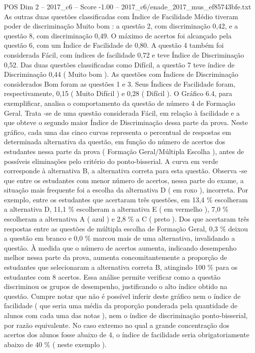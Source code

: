 \begin{textsample}{POS Dim 2 – 2017\_c6 – Score -1.00 – 2017\_c6/enade\_2017\_mus\_ef85743bfe.txt}
As outras duas questões classificadas com Índice de Facilidade Médio tiveram poder de discriminação Muito bom : a questão 2, com discriminação 0,42, e a questão 8, com discriminação 0,49.
O máximo de acertos foi alcançado pela questão 6, com um Índice de Facilidade de 0,80.
A questão 4 também foi considerada Fácil, com índices de facilidade 0,72 e teve Índice de Discriminação 0,52.
Das duas questões classificadas como Difícil, a questão 7 teve índice de Discriminação 0,44 ( Muito bom ).
As questões com Índices de Discriminação considerados Bom foram as questões 1 e 3.
Seus Índices de Facilidade foram, respectivamente, 0,15 ( Muito Difícil ) e 0,28 ( Difícil ).
O Gráfico 6.4, para exemplificar, analisa o comportamento da questão de número 4 de Formação Geral.
Trata -se de uma questão considerada Fácil, em relação à facilidade e a que obteve o segundo maior Índice de Discriminação dessa parte da prova.
Neste gráfico, cada uma das cinco curvas representa o percentual de respostas em determinada alternativa da questão, em função do número de acertos dos estudantes nessa parte da prova ( Formação Geral/Múltipla Escolha ), antes de possíveis eliminações pelo critério do ponto-bisserial.
A curva em verde corresponde à alternativa B, a alternativa correta para esta questão.
Observa -se que entre os estudantes com menor número de acertos, nessa parte do exame, a situação mais frequente foi a escolha da alternativa D ( em roxo ), incorreta.
Por exemplo, entre os estudantes que acertaram três questões, em 13,4 \% escolheram a alternativa D, 11,1 \% escolheram a alternativa E ( em vermelho ), 7,0 \% escolheram a alternativa A ( azul ) e 2,8 \% a C ( preto ).
Dos que acertaram três respostas entre as questões de múltipla escolha de Formação Geral, 0,3 \% deixou a questão em branco e 0,0 \% marcou mais de uma alternativa, invalidando a questão.
À medida que o número de acertos aumenta, indicando desempenho melhor nessa parte da prova, aumenta concomitantemente a proporção de estudantes que selecionaram a alternativa correta B, atingindo 100 \% para os estudantes com 8 acertos.
Essa análise permite verificar como a questão discriminou os grupos de desempenho, justificando o alto índice obtido na questão.
Cumpre notar que não é possível inferir deste gráfico nem o índice de facilidade ( que seria uma média da proporção ponderada pela quantidade de alunos com cada uma das notas ), nem o índice de discriminação ponto-bisserial, por razão equivalente.
No caso extremo no qual a grande concentração dos acertos dos alunos fosse abaixo de 4, o índice de facilidade seria obrigatoriamente abaixo de 40 \% ( neste exemplo ).

\end{textsample}
